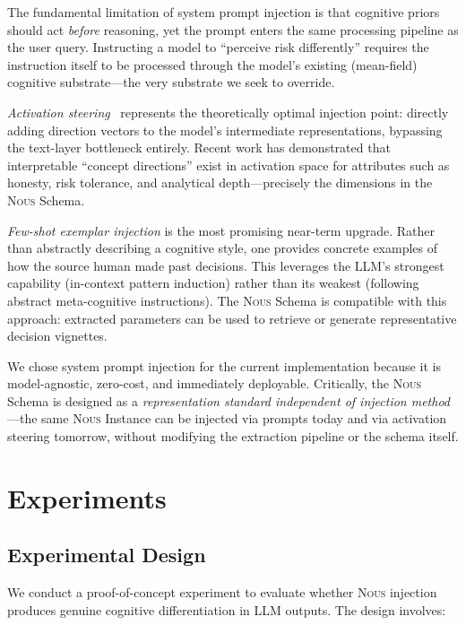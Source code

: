 \documentclass[11pt]{article}
\newcommand{\nous}{\textsc{Nous}}
\begin{document}
The fundamental limitation of system prompt injection is that cognitive priors should act \emph{before} reasoning, yet the prompt enters the same processing pipeline as the user query. Instructing a model to ``perceive risk differently'' requires the instruction itself to be processed through the model's existing (mean-field) cognitive substrate---the very substrate we seek to override.

\emph{Activation steering}~\citep{zou2023representation, turner2024activation} represents the theoretically optimal injection point: directly adding direction vectors to the model's intermediate representations, bypassing the text-layer bottleneck entirely. Recent work has demonstrated that interpretable ``concept directions'' exist in activation space for attributes such as honesty, risk tolerance, and analytical depth---precisely the dimensions in the \nous{} Schema.

\emph{Few-shot exemplar injection} is the most promising near-term upgrade. Rather than abstractly describing a cognitive style, one provides concrete examples of how the source human made past decisions. This leverages the LLM's strongest capability (in-context pattern induction) rather than its weakest (following abstract meta-cognitive instructions). The \nous{} Schema is compatible with this approach: extracted parameters can be used to retrieve or generate representative decision vignettes.

We chose system prompt injection for the current implementation because it is model-agnostic, zero-cost, and immediately deployable. Critically, the \nous{} Schema is designed as a \emph{representation standard independent of injection method}---the same \nous{} Instance can be injected via prompts today and via activation steering tomorrow, without modifying the extraction pipeline or the schema itself.


\section{Experiments}
\label{sec:experiments}

\subsection{Experimental Design}

We conduct a proof-of-concept experiment to evaluate whether \nous{} injection produces genuine cognitive differentiation in LLM outputs. The design involves:
\end{document}

